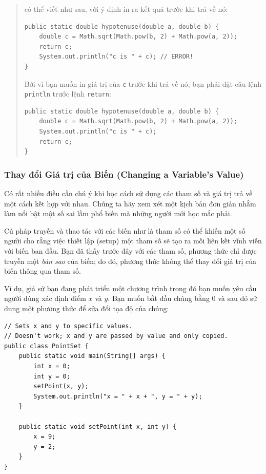 \begin{quote}
có thể viết như sau, với ý định in ra kết quả trước khi trả về nó:

\begin{verbatim}
public static double hypotenuse(double a, double b) {
    double c = Math.sqrt(Math.pow(b, 2) + Math.pow(a, 2));
    return c;
    System.out.println("c is " + c); // ERROR!
}
\end{verbatim}

Bởi vì bạn muốn in giá trị của \texttt{c} trước khi trả về nó, bạn phải
đặt câu lệnh \texttt{println} trước lệnh \texttt{return}:

\begin{verbatim}
public static double hypotenuse(double a, double b) {
    double c = Math.sqrt(Math.pow(b, 2) + Math.pow(a, 2));
    System.out.println("c is " + c);
    return c;
}
\end{verbatim}
\end{quote}

\subsubsection{Thay đổi Giá trị của Biến (Changing a Variable's
Value)}\label{thay-ux111ux1ed5i-giuxe1-trux1ecb-cux1ee7a-biux1ebfn-changing-a-variables-value}

Có rất nhiều điều cần chú ý khi học cách sử dụng các tham số và giá trị
trả về một cách kết hợp với nhau. Chúng ta hãy xem xét một kịch bản đơn
giản nhằm làm nổi bật một số sai lầm phổ biến mà những người mới học mắc
phải.

Cú pháp truyền và thao tác với các biến như là tham số có thể khiến một
số người cho rằng việc thiết lập (setup) một tham số sẽ tạo ra mối liên
kết vĩnh viễn với biến ban đầu. Bạn đã thấy trước đây với các tham số,
phương thức chỉ được truyền một \emph{bản sao} của biến; do đó, phương
thức không thể thay đổi giá trị của biến thông qua tham số.

Ví dụ, giả sử bạn đang phát triển một chương trình trong đó bạn muốn yêu
cầu người dùng xác định điểm \(x\) và \(y\). Bạn muốn bắt đầu chúng bằng
0 và sau đó sử dụng một phương thức để sửa đổi tọa độ của chúng:

\begin{verbatim}
// Sets x and y to specific values.
// Doesn't work; x and y are passed by value and only copied.
public class PointSet {
    public static void main(String[] args) {
        int x = 0;
        int y = 0;
        setPoint(x, y);
        System.out.println("x = " + x + ", y = " + y);
    }
    
    public static void setPoint(int x, int y) {
        x = 9;
        y = 2;
    }
}
\end{verbatim}

